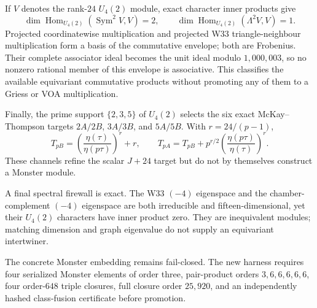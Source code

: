 If $V$ denotes the rank-$24$ $U_4(2)$ module, exact character inner products
give
\[
 \dim\operatorname{Hom}_{U_4(2)}(\operatorname{Sym}^2V,V)=2,
 \qquad
 \dim\operatorname{Hom}_{U_4(2)}(\Lambda^2V,V)=1.
\]
Projected coordinatewise multiplication and projected W33
triangle-neighbour multiplication form a basis of the commutative envelope;
both are Frobenius.  Their complete associator ideal becomes the unit ideal
modulo $1,000,003$, so no nonzero rational member of this envelope is
associative.  This classifies the available equivariant commutative products
without promoting any of them to a Griess or VOA multiplication.

Finally, the prime support $\{2,3,5\}$ of $U_4(2)$ selects the six exact
McKay--Thompson targets $2A/2B$, $3A/3B$, and $5A/5B$.  With
$r=24/(p-1)$,
\[
 T_{pB}=\left(\frac{\eta(\tau)}{\eta(p\tau)}\right)^r+r,
 \qquad
 T_{pA}=T_{pB}+p^{r/2}
 \left(\frac{\eta(p\tau)}{\eta(\tau)}\right)^r.
\]
These channels refine the scalar $J+24$ target but do not by themselves
construct a Monster module.

A final spectral firewall is exact.  The W33 $(-4)$ eigenspace and the
chamber-complement $(-4)$ eigenspace are both irreducible and
fifteen-dimensional, yet their $U_4(2)$ characters have inner product zero.
They are inequivalent modules; matching dimension and graph eigenvalue do not
supply an equivariant intertwiner.

The concrete Monster embedding remains fail-closed.  The new harness requires
four serialized Monster elements of order three, pair-product orders
$3,6,6,6,6,6$, four order-$648$ triple closures, full closure order $25,920$,
and an independently hashed class-fusion certificate before promotion.
